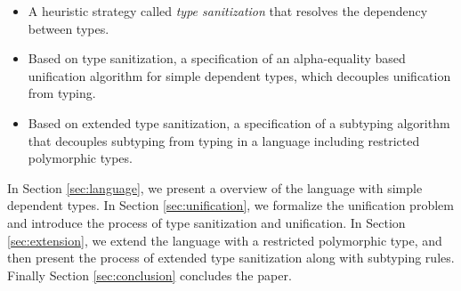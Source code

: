 \begin{itemize}
  \item A heuristic strategy called \textit{type sanitization} that resolves the
    dependency between types.
  \item Based on type sanitization, a specification of an alpha-equality based
    unification algorithm
    for simple dependent types, which
    decouples unification from typing.
  \item Based on extended type sanitization, a specification of a subtyping algorithm
    that
    decouples
    subtyping from typing in a language including restricted polymorphic types.
\end{itemize}

In Section \ref{sec:language}, we present a overview of the language with simple
dependent types. In Section \ref{sec:unification}, we formalize the unification
problem and introduce the process of type sanitization and unification. In
Section \ref{sec:extension}, we extend the language with a restricted
polymorphic type, and then present the process of extended type sanitization
along with subtyping rules. Finally Section \ref{sec:conclusion} concludes the
paper.